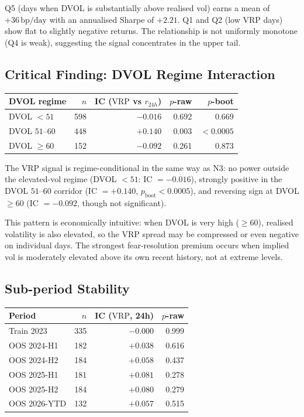 \documentclass[12pt, a4paper]{article}
\theoremstyle{plain}
\theoremstyle{definition}
\newcommand{\VRP}{\mathrm{VRP}}
\newcommand{\bp}{\,\mathrm{bp}}
\begin{document}
Q5 (days when DVOL is substantially above realised vol) earns a mean
of $+36\bp/\text{day}$ with an annualised Sharpe of $+2.21$.  Q1 and Q2
(low VRP days) show flat to slightly negative returns.  The relationship
is not uniformly monotone (Q4 is weak), suggesting the signal concentrates
in the upper tail.

\subsection{Critical Finding: DVOL Regime Interaction}

\begin{center}
\begin{tabular}{lrrrr}
\toprule
DVOL regime & $n$ & IC ($\VRP$ vs $r_{24h}$) & $p$-raw & $p$-boot \\
\midrule
DVOL $< 51$      & 598 & $-0.016$ & 0.692 & 0.669 \\
DVOL $51$--$60$  & 448 & $+0.140$ & 0.003 & $<0.0005$ \\
DVOL $\geq 60$   & 152 & $-0.092$ & 0.261 & 0.873 \\
\bottomrule
\end{tabular}
\end{center}

The VRP signal is regime-conditional in the same way as N3: no power
outside the elevated-vol regime (DVOL $< 51$: IC $= -0.016$), strongly
positive in the DVOL $51$--$60$ corridor (IC $= +0.140$, $p_{\mathrm{boot}}
< 0.0005$), and reversing sign at DVOL $\geq 60$ (IC $= -0.092$, though
not significant).

This pattern is economically intuitive: when DVOL is very high ($\geq 60$),
realised volatility is also elevated, so the VRP spread may be compressed
or even negative on individual days.  The strongest fear-resolution
premium occurs when implied vol is moderately elevated above its own
recent history, not at extreme levels.

\subsection{Sub-period Stability}

\begin{center}
\begin{tabular}{lrrr}
\toprule
Period & $n$ & IC ($\VRP$, 24h) & $p$-raw \\
\midrule
Train 2023   & 335 & $-0.000$ & 0.999 \\
OOS 2024-H1  & 182 & $+0.038$ & 0.616 \\
OOS 2024-H2  & 184 & $+0.058$ & 0.437 \\
OOS 2025-H1  & 181 & $+0.081$ & 0.278 \\
OOS 2025-H2  & 184 & $+0.080$ & 0.279 \\
OOS 2026-YTD & 132 & $+0.057$ & 0.515 \\
\bottomrule
\end{tabular}
\end{center}
\end{document}
